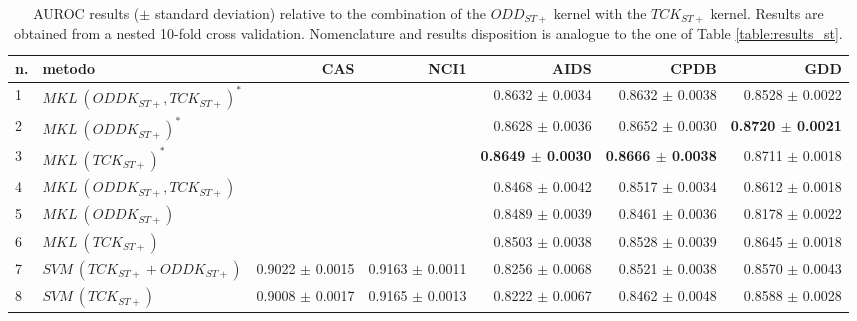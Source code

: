 \begin{landscape}
\begin{table}[ht]
        \begin{tabular}{|l|l|r|r|r|r|r|}
            \hline
            n. & metodo&CAS&NCI1&AIDS&CPDB&GDD\\
            \hline
            1& $MKL~(ODDK_{ST+}, TCK_{ST+})^*$&&&0.8632 $\pm$  0.0034&0.8632 $\pm$  0.0038&0.8528 $\pm$ 0.0022\\
            2& $MKL~(ODDK_{ST+})^*$&&&0.8628 $\pm$  0.0036&0.8652 $\pm$ 0.0030&\textbf{0.8720 $\pm$ 0.0021}\\
            3& $MKL~(TCK_{ST+})^*$&&&\textbf{0.8649 $\pm$  0.0030}&\textbf{0.8666 $\pm$  0.0038}&0.8711 $\pm$ 0.0018 \\
            \hline
            4& $MKL~(ODDK_{ST+}, TCK_{ST+})$&&&0.8468 $\pm$ 0.0042&0.8517 $\pm$ 0.0034&0.8612 $\pm$ 0.0018\\
            5& $MKL~(ODDK_{ST+})$&&&0.8489 $\pm$  0.0039&0.8461 $\pm$ 0.0036&0.8178 $\pm$ 0.0022\\
            6& $MKL~(TCK_{ST+})$&&&0.8503 $\pm$  0.0038&0.8528 $\pm$ 0.0039&0.8645 $\pm$ 0.0018\\
            \hline
            7& $SVM~(TCK_{ST+} + ODDK_{ST+})$&0.9022 $\pm$ 0.0015 &0.9163 $\pm$ 0.0011&0.8256 $\pm$ 0.0068&0.8521 $\pm$ 0.0038&0.8570 $\pm$ 0.0043\\
            8& $SVM~(TCK_{ST+})$&0.9008 $\pm$ 0.0017&0.9165 $\pm$ 0.0013&0.8222 $\pm$ 0.0067&0.8462 $\pm$ 0.0048&0.8588 $\pm$ 0.0028\\
            \hline
        \end{tabular}
        \caption{AUROC results ($\pm$ standard deviation) relative to the combination
                of the $ODD_{ST+}$ kernel with the $TCK_{ST+}$ kernel. Results are
                obtained from a nested 10-fold cross validation. Nomenclature and
                results disposition is analogue to the one of Table \ref{table:results_st}.}
        \label{table:results_stp}
    \end{table}

\end{landscape}


